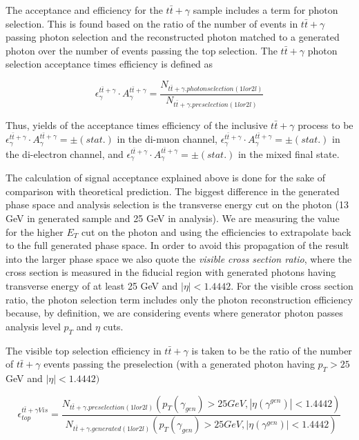 The acceptance and efficiency for the $t\bar{t}+\gamma$ sample includes a term for photon selection. This is found based on the ratio of the number of events in $t\bar{t}+\gamma$ passing photon selection and the reconstructed photon matched to a generated photon over the number of events passing the top selection. The $t\bar{t}+\gamma$ photon selection acceptance times efficiency is defined as

\begin{equation}
	\epsilon^{t\bar{t}+\gamma}_{\gamma} \cdot A^{t\bar{t}+\gamma}_{\gamma} = \frac{N_{t\bar{t}+\gamma.photonselection(1lor2l)}}{N_{t\bar{t}+\gamma.preselection(1lor2l)}} 
\end{equation}

Thus, yields of the acceptance times efficiency of the inclusive $t\bar{t}+\gamma$ process to be $\epsilon^{t\bar{t}+\gamma}_{\gamma} \cdot A^{t\bar{t}+\gamma}_{\gamma} =   \pm  (stat.)$ in the di-muon channel, $\epsilon^{t\bar{t}+\gamma}_{\gamma} \cdot A^{t\bar{t}+\gamma}_{\gamma} =  \pm  (stat.)$ in the di-electron channel, and $\epsilon^{t\bar{t}+\gamma}_{\gamma} \cdot A^{t\bar{t}+\gamma}_{\gamma} =  \pm  (stat.)$ in the mixed final state.

The calculation of signal acceptance explained above is done for the sake of comparison with theoretical prediction. The biggest difference in the generated phase space and analysis selection is the transverse energy cut on the photon (13 GeV in generated sample and 25 GeV in analysis). We are measuring the value for the higher $E_T$ cut on the photon and using the efficiencies to extrapolate back to the full generated phase space. In order to avoid this propagation of the result into the larger phase space we also quote the \emph{visible cross section ratio}, where the cross section is measured in the fiducial region with generated photons having transverse energy of at least 25 GeV and $| \eta | < 1.4442$. For the visible cross section ratio, the photon selection term includes only the photon reconstruction efficiency because, by definition, we are considering events where generator photon passes analysis level $p_T$ and $\eta$ cuts.

The visible top selection efficiency in $t\bar{t}+\gamma$ is taken to be the ratio of the number of $t\bar{t}+\gamma$ events passing the preselection (with a generated photon having $p_T > 25$ GeV and $| \eta | < 1.4442)$

\begin{equation}
	\epsilon^{t\bar{t}+\gamma Vis}_{top} = \frac{N_{t\bar{t}+\gamma.preselection(1lor2l)}\left( p_T(\gamma_{gen}) > 25 GeV, |\eta(\gamma^{gen})| < 1.4442 \right)}{N_{t\bar{t}+\gamma.generated(1lor2l)}\left( p_T(\gamma_{gen}) > 25 GeV, |\eta(\gamma^{gen})| < 1.4442 \right)} 
\end{equation}

